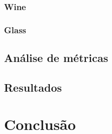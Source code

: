 \documentclass{article}
\begin{document}
\subsubsection{Wine}

\subsubsection{Glass}

\subsection{Análise de métricas}

\subsection{Resultados}

\section{Conclusão}

\printbibliography
\end{document}
